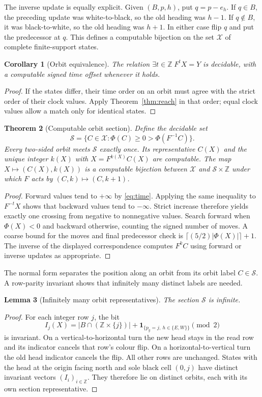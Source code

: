 \documentclass[11pt,a4paper]{article}
\newtheorem{theorem}{Theorem}[section]
\newtheorem{lemma}[theorem]{Lemma}
\newtheorem{corollary}[theorem]{Corollary}
\theoremstyle{remark}\newtheorem{remark}[theorem]{Remark}
\newcommand{\Z}{\mathbb Z}\newcommand{\N}{\mathbb N}\newcommand{\Q}{\mathbb Q}
\begin{document}
The inverse update is equally explicit. Given $(B,p,h)$, put $q=p-e_h$.
If $q\in B$, the preceding update was white-to-black, so the old heading was
$h-1$. If $q\notin B$, it was black-to-white, so the old heading was $h+1$.
In either case flip $q$ and put the predecessor at $q$. This defines a computable
bijection on the set $\mathcal X$ of complete finite-support states.

\begin{corollary}[Orbit equivalence]
The relation $\exists t\in\Z\;F^tX=Y$ is decidable, with a computable signed
time offset whenever it holds.
\end{corollary}
\begin{proof}
If the states differ, their time order on an orbit must agree with the strict
order of their clock values. Apply Theorem~\ref{thm:reach} in that order;
equal clock values allow a match only for identical states.
\end{proof}

\begin{theorem}[Computable orbit section]\label{thm:section}
Define the decidable set
\[
 \mathcal S=\{C\in\mathcal X:\Phi(C)\ge0>\Phi(F^{-1}C)\}.
\]
Every two-sided orbit meets $\mathcal S$ exactly once. Its representative $C(X)$
and the unique integer $k(X)$ with $X=F^{k(X)}C(X)$ are computable. The map
$X\mapsto(C(X),k(X))$ is a computable bijection between $\mathcal X$ and
$\mathcal S\times\Z$ under which $F$ acts by $(C,k)\mapsto(C,k+1)$.
\end{theorem}
\begin{proof}
Forward values tend to $+\infty$ by \eqref{eq:time}. Applying the same inequality
to $F^{-t}X$ shows that backward values tend to $-\infty$. Strict increase
therefore yields exactly one crossing from negative to nonnegative values.
Search forward when $\Phi(X)<0$ and backward otherwise, counting the signed
number of moves. A coarse bound for the moves and final predecessor check is
$\lceil(5/2)|\Phi(X)|\rceil+1$. The inverse of the displayed correspondence
computes $F^kC$ using forward or inverse updates as appropriate.
\end{proof}

The normal form separates the position along an orbit from its orbit label
$C\in\mathcal S$. A row-parity invariant shows that infinitely many distinct
labels are needed.

\begin{lemma}[Infinitely many orbit representatives]
The section $\mathcal S$ is infinite.
\end{lemma}
\begin{proof}
For each integer row $j$, the bit
\[
 I_j(X)=|B\cap(\Z\times\{j\})|
        +\mathbf1_{\{p_y=j,\ h\in\{E,W\}\}}\pmod2
\]
is invariant. On a vertical-to-horizontal turn the new head stays in the
read row and its indicator cancels that row's colour flip. On a
horizontal-to-vertical turn the old head indicator cancels the flip.
All other rows are unchanged. States with the head at the origin facing north
and sole black cell $(0,j)$ have distinct invariant vectors $(I_i)_{i\in\Z}$.
They therefore lie on distinct orbits, each with its own section representative.
\end{proof}
\end{document}
